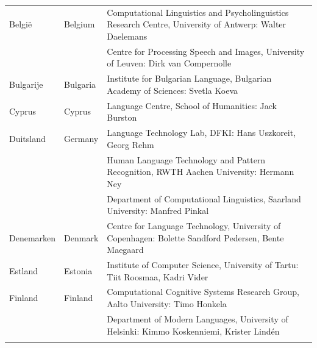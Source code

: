 \begin{longtable}{@{}llp{113mm}@{}}
  Belgi{\"e} & \textcolor{grey1}{Belgium} & Computational Linguistics and Psycholinguistics Research Centre, University of Antwerp: Walter Daelemans\\ \addlinespace
  & & Centre for Processing Speech and Images, University of Leuven: Dirk van Compernolle \\ \addlinespace

  Bulgarije & \textcolor{grey1}{Bulgaria} & Institute for Bulgarian Language, Bulgarian Academy of Sciences: Svetla Koeva \\ \addlinespace

   Cyprus & \textcolor{grey1}{Cyprus} & Language Centre, School of Humanities: Jack Burston \\ \addlinespace

  Duitsland & \textcolor{grey1}{Germany} & Language Technology Lab, DFKI: Hans Uszkoreit, Georg Rehm\\ \addlinespace
  & & Human Language Technology and Pattern Recognition, RWTH Aachen University: Hermann Ney \\ \addlinespace
  & & Department of Computational Linguistics, Saarland University: Manfred Pinkal\\\addlinespace

  Denemarken &  \textcolor{grey1}{Denmark} & Centre for Language Technology, University of Copenhagen: \newline Bolette Sandford Pedersen, Bente Maegaard\\ \addlinespace
  Estland & \textcolor{grey1}{Estonia} & Institute of Computer Science, University of Tartu: Tiit Roosmaa, Kadri Vider\\ \addlinespace

  Finland & \textcolor{grey1}{Finland} & Computational Cognitive Systems Research Group, Aalto University: Timo Honkela\\ \addlinespace
  & & Department of Modern Languages, University of Helsinki: Kimmo Koskenniemi, Krister Lindén \\ \addlinespace


\end{longtable}
